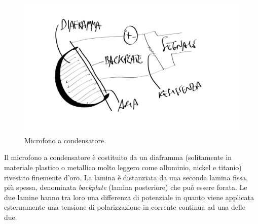 \begin{refsection}
\begin{figure}[h]
\centering
\includegraphics[width=0.99\columnwidth]{CAPITOLI/0200/img/mic-capacitor.png}
\caption[]{Microfono a condensatore.}
\label{mic:condensatore}
\end{figure}

Il microfono a condensatore è costituito da un diaframma (solitamente in materiale
plastico o metallico molto leggero come alluminio, nickel e titanio)
rivestito finemente d'oro. La lamina è distanziata da una seconda lamina fissa, più spessa,
denominata \emph{backplate} (lamina posteriore) che può essere forata. Le due
lamine hanno tra loro una differenza di potenziale in quanto
viene applicata esternamente una tensione di polarizzazione in corrente continua ad una delle
due.


\end{refsection}
